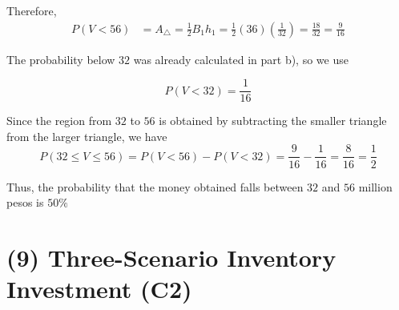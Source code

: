 	Therefore,
	\[
	\begin{aligned}
		P(V<56)
		&=A_{\triangle}
		=\frac{1}{2}B_1h_1
		=\frac{1}{2}(36)\left(\frac{1}{32}\right)
		=\frac{18}{32}
		=\frac{9}{16}
	\end{aligned}
	\]
	
	The probability below $32$ was already calculated in part b), so we use
	
	\[P(V<32)=\frac{1}{16}\]
	
	Since the region from $32$ to $56$ is obtained by subtracting the smaller triangle from the larger triangle, we have
	\[
	P(32\le V\le 56)=P(V<56)-P(V<32)=\frac{9}{16}-\frac{1}{16}
	=\frac{8}{16}
	=\frac{1}{2}
	\]
	
	Thus, the probability that the money obtained falls between $32$ and $56$ million pesos is $50\%$

	
	
	
%	
%	
%	
%	
%	
%	
	
\section{(9) Three-Scenario Inventory Investment (C2)}
\label{sec:three-scenario-inventory-investment-c2}


